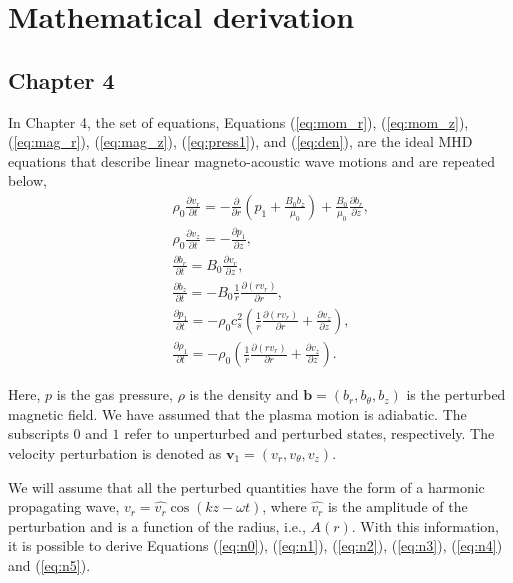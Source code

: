 \chapter{Mathematical derivation} 

\section*{Chapter 4}

In Chapter 4, the set of equations, Equations (\ref{eq:mom_r}), (\ref{eq:mom_z}), (\ref{eq:mag_r}), (\ref{eq:mag_z}), (\ref{eq:press1}), and (\ref{eq:den}), are the ideal MHD equations that describe linear magneto-acoustic wave motions and are repeated below,
\begin{align}
    &&\rho_0 \frac{\partial v_r}{\partial t}=-\frac{\partial}{\partial r}
    \left(p_1+\frac{B_0b_z}{\mu_0}\right)+\frac{B_0}{\mu_0}\frac{\partial b_r}{\partial z},
    \label{eq:apen_mom_r}\\
    &&\rho_0\frac{\partial v_z}{\partial t}=-\frac{\partial p_1}{\partial z},
    \label{eq:apen_mom_z}\\
    &&\frac{\partial b_r}{\partial t}=B_0\frac{\partial v_r}{\partial z},
    \label{eq:apen_mag_r}\\
    &&\frac{\partial b_z}{\partial t}=-B_0\frac{1}{r}\frac{\partial (rv_r)}{\partial r},
    \label{eq:apen_mag_z}\\
    &&\frac{\partial p_1}{\partial t}=-\rho_0
    c_s^2\left(\frac{1}{r}\frac{\partial(rv_r)}{\partial r}+\frac{\partial v_z}{\partial z}\right),
    \label{eq:apen_press1}\\
    &&\frac{\partial \rho_1}{\partial t}=-\rho_0\left(\frac{1}{r}\frac{\partial (rv_r)}{\partial r}+\frac{\partial v_z}{\partial z}\right).
    \label{eq:apen_den}
\end{align}

Here, $p$ is the gas pressure, $\rho$ is the density and $\textbf{b} = (b_r,b_{\theta},b_z)$ is the perturbed magnetic field.
We have assumed that the plasma motion is adiabatic.
The subscripts $0$ and $1$ refer to unperturbed and perturbed states, respectively.
The velocity perturbation is denoted as $\textbf{v}_1= (v_r, v_{\theta}, v_z)$.

We will assume that all the perturbed quantities have the form of a harmonic propagating wave, $v_r=\hat{v_r}\cos(kz-\omega t)$, where $\hat{v_r}$ is the amplitude of the perturbation and is a function of the radius, i.e., $A(r)$.
With this information, it is possible to derive Equations (\ref{eq:n0}), (\ref{eq:n1}), (\ref{eq:n2}), (\ref{eq:n3}), (\ref{eq:n4}) and (\ref{eq:n5}).

